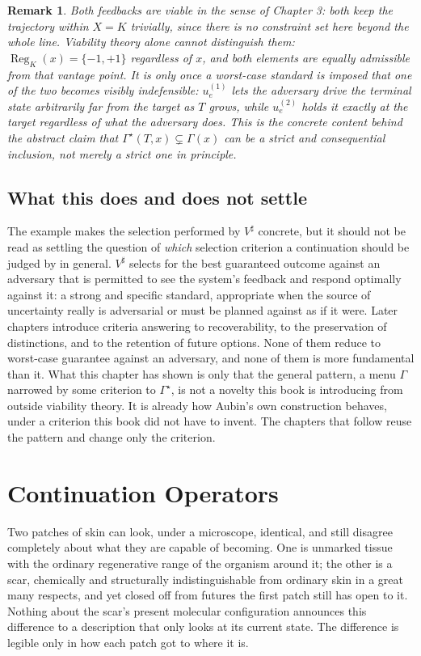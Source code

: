 \documentclass[11pt]{report}
\newtheorem{remark}{Remark}[chapter]
\begin{document}
\begin{remark}
Both feedbacks are viable in the sense of Chapter 3: both keep the
trajectory within $X = K$ trivially, since there is no constraint set
here beyond the whole line. Viability theory alone cannot distinguish
them: $\operatorname{Reg}_K(x) = \{-1,+1\}$ regardless of $x$, and
both elements are equally admissible from that vantage point. It is
only once a worst-case standard is imposed that one of the two
becomes visibly indefensible: $u_e^{(1)}$ lets the adversary drive the
terminal state arbitrarily far from the target as $T$ grows, while
$u_e^{(2)}$ holds it exactly at the target regardless of what the
adversary does. This is the concrete content behind the abstract claim
that $\Gamma^\star(T,x) \subsetneq \Gamma(x)$ can be a strict and
consequential inclusion, not merely a strict one in principle.
\end{remark}

\section*{What this does and does not settle}

The example makes the selection performed by $V^\sharp$ concrete, but
it should not be read as settling the question of \emph{which}
selection criterion a continuation should be judged by in general.
$V^\sharp$ selects for the best guaranteed outcome against an adversary
that is permitted to see the system's feedback and respond
optimally against it: a strong and specific standard, appropriate
when the source of uncertainty really is adversarial or must be
planned against as if it were. Later chapters introduce criteria
answering to recoverability, to the preservation of distinctions, and
to the retention of future options. None of them reduce to worst-case
guarantee against an adversary, and none of them is more fundamental
than it. What this chapter has shown is only that the general pattern,
a menu $\Gamma$ narrowed by some criterion to $\Gamma^\star$, is
not a novelty this book is introducing from outside viability theory.
It is already how Aubin's own construction behaves, under a criterion
this book did not have to invent. The chapters that follow reuse the
pattern and change only the criterion.

\chapter{Continuation Operators}

Two patches of skin can look, under a microscope, identical, and still
disagree completely about what they are capable of becoming. One is
unmarked tissue with the ordinary regenerative range of the organism
around it; the other is a scar, chemically and structurally
indistinguishable from ordinary skin in a great many respects, and yet
closed off from futures the first patch still has open to it. Nothing
about the scar's present molecular configuration announces this
difference to a description that only looks at its current state. The
difference is legible only in how each patch got to where it is.
\end{document}
